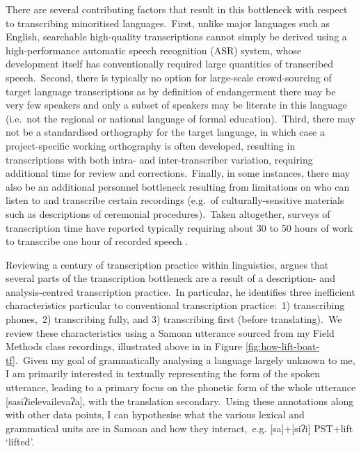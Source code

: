 \documentclass[main.tex]{subfiles}
\begin{document}
There are several contributing factors that result in this bottleneck with respect to transcribing minoritised languages.~First, unlike major languages such as English, searchable high-quality transcriptions cannot simply be derived using a high-performance automatic speech recognition (ASR) system, whose development itself has conventionally required large quantities of transcribed speech.~Second, there is typically no option for large-scale crowd-sourcing of target language transcriptions as by definition of endangerment there may be very few speakers and only a subset of speakers may be literate in this language (i.e.~not the regional or national language of formal education).~Third, there may not be a standardised orthography for the target language, in which case a project-specific working orthography is often developed, resulting in transcriptions with both intra- and inter-transcriber variation, requiring additional time for review and corrections.~Finally, in some instances, there may also be an additional personnel bottleneck resulting from limitations on who can listen to and transcribe certain recordings (e.g.~of culturally-sensitive materials such as descriptions of ceremonial procedures).~Taken altogether, surveys of transcription time have reported typically requiring about 30 to 50 hours of work to transcribe one hour of recorded speech \parencite{durantin2017survey,michaud2014towards,zahrer2020towards}.

Reviewing a century of transcription practice within linguistics, \textcite{bird-2020-sparse} argues that several parts of the transcription bottleneck are a result of a description- and analysis-centred transcription practice.~In particular, he identifies three inefficient characteristics particular to conventional transcription practice:~1) transcribing phones,~2) transcribing fully, and 3) transcribing first (before translating).~We review these characteristics using a Samoan utterance sourced from my Field Methods class recordings, illustrated above in in Figure \ref{fig:how-lift-boat-tf}.~Given my goal of grammatically analysing a language largely unknown to me, I am primarily interested in textually representing the form of the spoken utterance, leading to a primary focus on the phonetic form of the whole utterance [sasiʔielevailevaʔa], with the translation secondary.~Using these annotations along with other data points, I can hypothesise what the various lexical and grammatical units are in Samoan and how they interact,~e.g. [sa]+[siʔi] P{\footnotesize{}ST}+lift `lifted'.
\end{document}

